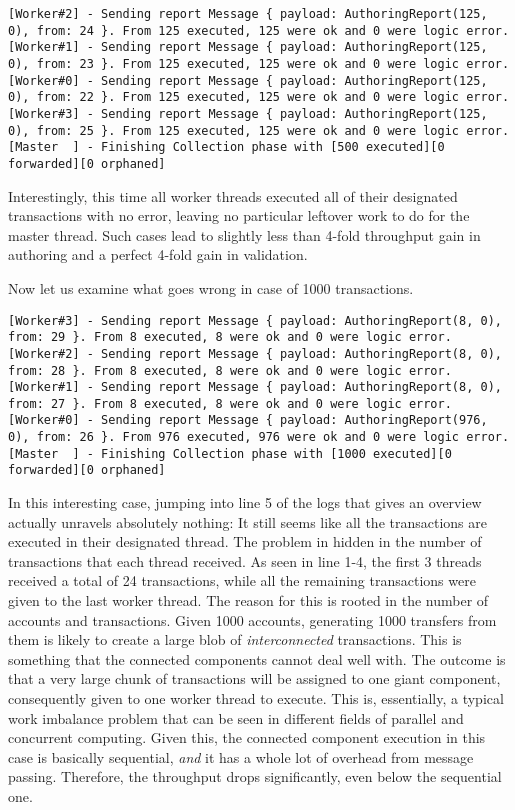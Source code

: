 \begin{lstlisting}
[Worker#2] - Sending report Message { payload: AuthoringReport(125, 0), from: 24 }. From 125 executed, 125 were ok and 0 were logic error.
[Worker#1] - Sending report Message { payload: AuthoringReport(125, 0), from: 23 }. From 125 executed, 125 were ok and 0 were logic error.
[Worker#0] - Sending report Message { payload: AuthoringReport(125, 0), from: 22 }. From 125 executed, 125 were ok and 0 were logic error.
[Worker#3] - Sending report Message { payload: AuthoringReport(125, 0), from: 25 }. From 125 executed, 125 were ok and 0 were logic error.
[Master  ] - Finishing Collection phase with [500 executed][0 forwarded][0 orphaned]
\end{lstlisting}

Interestingly, this time all worker threads executed all of their designated transactions with no
error, leaving no particular leftover work to do for the master thread. Such cases lead to slightly
less than 4-fold throughput gain in authoring and a perfect 4-fold gain in validation.

Now let us examine what goes wrong in case of 1000 transactions.

\begin{lstlisting}
[Worker#3] - Sending report Message { payload: AuthoringReport(8, 0), from: 29 }. From 8 executed, 8 were ok and 0 were logic error.
[Worker#2] - Sending report Message { payload: AuthoringReport(8, 0), from: 28 }. From 8 executed, 8 were ok and 0 were logic error.
[Worker#1] - Sending report Message { payload: AuthoringReport(8, 0), from: 27 }. From 8 executed, 8 were ok and 0 were logic error.
[Worker#0] - Sending report Message { payload: AuthoringReport(976, 0), from: 26 }. From 976 executed, 976 were ok and 0 were logic error.
[Master  ] - Finishing Collection phase with [1000 executed][0 forwarded][0 orphaned]
\end{lstlisting}

In this interesting case, jumping into line 5 of the logs that gives an overview actually unravels
absolutely nothing: It still seems like all the transactions are executed in their designated
thread. The problem in hidden in the number of transactions that each thread received. As seen in
line 1-4, the first 3 threads received a total of 24 transactions, while all the remaining
transactions were given to the last worker thread. The reason for this is rooted in the number of
accounts and transactions. Given 1000 accounts, generating 1000 transfers from them is likely to
create a large blob of \textit{interconnected} transactions. This is something that the connected
components cannot deal well with. The outcome is that a very large chunk of transactions will be
assigned to one giant component, consequently given to one worker thread to execute. This is,
essentially, a typical work imbalance problem that can be seen in different fields of parallel and
concurrent computing. Given this, the connected component execution in this case is basically
sequential, \textit{and} it has a whole lot of overhead from message passing. Therefore, the
throughput drops significantly, even below the sequential one.

